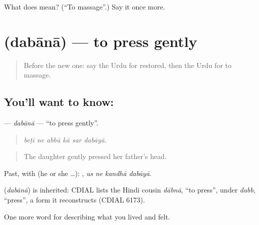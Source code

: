 \begin{tcolorbox}[breakable,colback=teal!4,colframe=teal!35!black,title={Before you move on}]
What does   mean? (\textquotedblleft{}To massage\textquotedblright{}.) Say it once more.
\end{tcolorbox}
\section[\texorpdfstring{\ur{دبانا} (dabānā)}{دبانا (dabānā)}]{ (dabānā) — to press gently}

\label{lesson:UR-C481-dabana}



\begin{quote}
Before the new one: say the Urdu for restored, then the Urdu for to massage.
\end{quote}

\subsection*{You'll want to know: }
\textbf{} — \emph{dabānā} — \textquotedblleft{}to press gently\textquotedblright{}.

\begin{quote}
     
\end{quote}

\begin{quote}
\emph{beṭī ne abbū kā sar dabāyā.}
\end{quote}

\begin{quote}
The daughter gently pressed her father's head.
\end{quote}

Past, with  (he or she …):    , \emph{us ne kandhā dabāyā}.

\begin{cousinweb}
\textbf{} (\emph{dabānā}) is inherited: CDIAL lists the Hindi cousin \emph{dābnā}, \textquotedblleft{}to press\textquotedblright{}, under \emph{dabb}, \textquotedblleft{}press\textquotedblright{}, a form it reconstructs (CDIAL 6173).
\end{cousinweb}

\begin{grammarlens}[title={What you've built}]
One more word for describing what you lived and felt.
\end{grammarlens}


